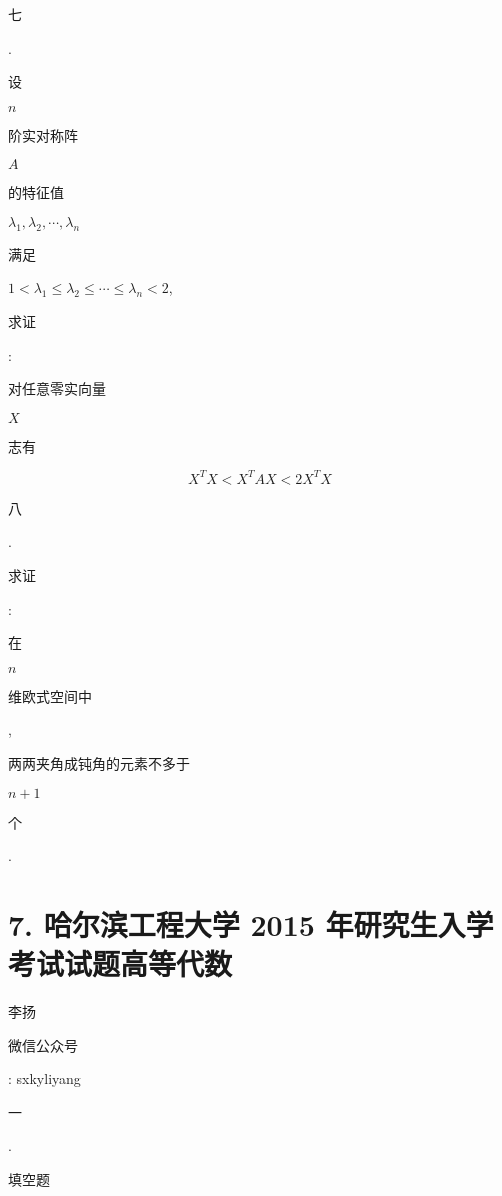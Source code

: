 \documentclass[10pt]{article}
\begin{document}
\begin{CJK}{UTF8}{mj}七\end{CJK}. \begin{CJK}{UTF8}{mj}设\end{CJK} $n$ \begin{CJK}{UTF8}{mj}阶实对称阵\end{CJK} $A$ \begin{CJK}{UTF8}{mj}的特征值\end{CJK} $\lambda_{1}, \lambda_{2}, \cdots, \lambda_{n}$ \begin{CJK}{UTF8}{mj}满足\end{CJK} $1<\lambda_{1} \leq \lambda_{2} \leq \cdots \leq \lambda_{n}<2$, \begin{CJK}{UTF8}{mj}求证\end{CJK}: \begin{CJK}{UTF8}{mj}对任意零实向量\end{CJK} $X$ \begin{CJK}{UTF8}{mj}志有\end{CJK}
$$
X^{T} X<X^{T} A X<2 X^{T} X
$$
\begin{CJK}{UTF8}{mj}八\end{CJK}. \begin{CJK}{UTF8}{mj}求证\end{CJK}: \begin{CJK}{UTF8}{mj}在\end{CJK} $n$ \begin{CJK}{UTF8}{mj}维欧式空间中\end{CJK}, \begin{CJK}{UTF8}{mj}两两夹角成钝角的元素不多于\end{CJK} $n+1$ \begin{CJK}{UTF8}{mj}个\end{CJK}.

\section{7. 哈尔滨工程大学 2015 年研究生入学考试试题高等代数}
\begin{CJK}{UTF8}{mj}李扬\end{CJK}

\begin{CJK}{UTF8}{mj}微信公众号\end{CJK}: sxkyliyang

\begin{CJK}{UTF8}{mj}一\end{CJK}. \begin{CJK}{UTF8}{mj}填空题\end{CJK}
\end{document}
